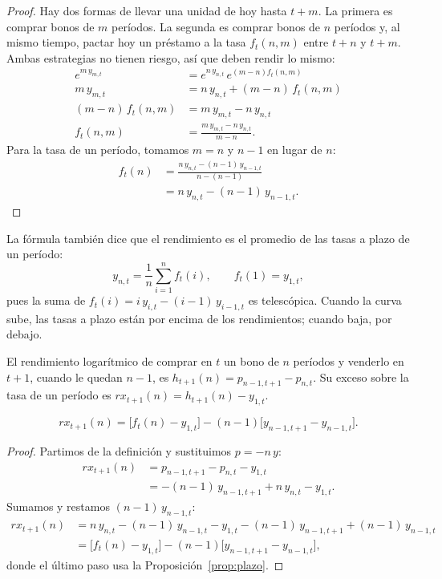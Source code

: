 \begin{proof}
Hay dos formas de llevar una unidad de hoy hasta $t+m$. La primera es comprar bonos de $m$ períodos. La segunda es
comprar bonos de $n$ períodos y, al mismo tiempo, pactar hoy un préstamo a la tasa $f_t(n,m)$ entre $t+n$ y $t+m$.
Ambas estrategias no tienen riesgo, así que deben rendir lo mismo:
\begin{align*}
  e^{m\,y_{m,t}} &= e^{n\,y_{n,t}}\,e^{(m-n)f_t(n,m)}\\
  m\,y_{m,t}     &= n\,y_{n,t}+(m-n)\,f_t(n,m)\\
  (m-n)\,f_t(n,m) &= m\,y_{m,t}-n\,y_{n,t}\\
  f_t(n,m)       &= \frac{m\,y_{m,t}-n\,y_{n,t}}{m-n}.
\end{align*}
Para la tasa de un período, tomamos $m=n$ y $n-1$ en lugar de $n$:
\begin{align*}
  f_t(n) &= \frac{n\,y_{n,t}-(n-1)\,y_{n-1,t}}{n-(n-1)}\\
         &= n\,y_{n,t}-(n-1)\,y_{n-1,t}.
\end{align*}
\end{proof}

La fórmula también dice que el rendimiento es el promedio de las tasas a plazo de un período:
\[
  y_{n,t}=\frac1n\sum_{i=1}^{n}f_t(i),\qquad f_t(1)=y_{1,t},
\]
pues la suma de $f_t(i)=i\,y_{i,t}-(i-1)\,y_{i-1,t}$ es telescópica. Cuando la curva sube, las tasas a plazo están por encima
de los rendimientos; cuando baja, por debajo.

\begin{definicion}
El rendimiento logarítmico de comprar en $t$ un bono de $n$ períodos y venderlo en $t+1$, cuando le quedan $n-1$, es
$h_{t+1}(n)=p_{n-1,t+1}-p_{n,t}$. Su exceso sobre la tasa de un período es $rx_{t+1}(n)=h_{t+1}(n)-y_{1,t}$.
\end{definicion}

\begin{proposicion}\label{prop:rx}
\[
  rx_{t+1}(n)=\bigl[f_t(n)-y_{1,t}\bigr]-(n-1)\bigl[y_{n-1,t+1}-y_{n-1,t}\bigr].
\]
\end{proposicion}

\begin{proof}
Partimos de la definición y sustituimos $p=-n\,y$:
\begin{align*}
  rx_{t+1}(n) &= p_{n-1,t+1}-p_{n,t}-y_{1,t}\\
              &= -(n-1)\,y_{n-1,t+1}+n\,y_{n,t}-y_{1,t}.
\end{align*}
Sumamos y restamos $(n-1)\,y_{n-1,t}$:
\begin{align*}
  rx_{t+1}(n) &= n\,y_{n,t}-(n-1)\,y_{n-1,t}-y_{1,t}-(n-1)\,y_{n-1,t+1}+(n-1)\,y_{n-1,t}\\
              &= \bigl[f_t(n)-y_{1,t}\bigr]-(n-1)\bigl[y_{n-1,t+1}-y_{n-1,t}\bigr],
\end{align*}
donde el último paso usa la Proposición~\ref{prop:plazo}.
\end{proof}

